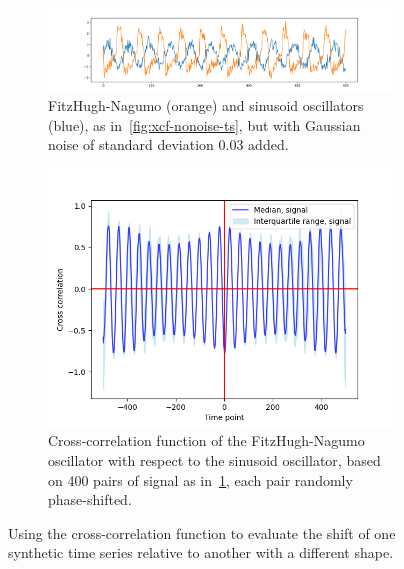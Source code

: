 \begin{figure}
  \begin{subfigure}[t]{0.45\textwidth}
  \centering
    \includegraphics[width=\linewidth]{sinusoid_and_fitzhughnagumo.png}
    \caption{
      FitzHugh-Nagumo (orange) and sinusoid oscillators (blue), as in~\ref{fig:xcf-nonoise-ts}, but with Gaussian noise of standard deviation 0.03 added.
    }
    \label{fig:xcf-gausnoise-ts}
  \end{subfigure}%
  \centering
  \begin{subfigure}[t]{0.45\textwidth}
  \centering
    \includegraphics[width=\linewidth]{randomshift_sinusoid_fitzhughnagumo_noisy_xcf.png}
    \caption{
      Cross-correlation function of the FitzHugh-Nagumo oscillator with respect to the sinusoid oscillator, based on 400 pairs of signal as in~\ref{fig:xcf-gausnoise-ts}, each pair randomly phase-shifted.
    }
    \label{fig:xcf-gausnoise-xcf}
  \end{subfigure}

  \caption{
    Using the cross-correlation function to evaluate the shift of one synthetic time series relative to another with a different shape.
  }
  \label{fig:xcf}
\end{figure}

